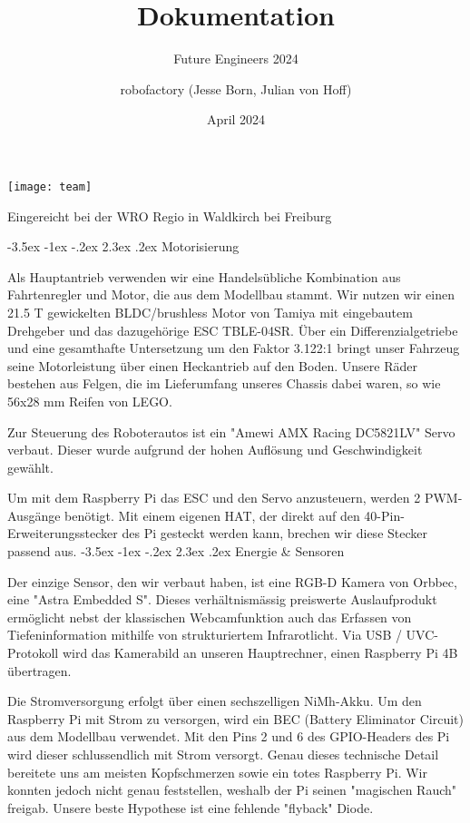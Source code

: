 \documentclass[a4paper]{scrarticle}
\makeatletter
\renewcommand\section{\@startsection {section}{1}{\z@}%
                                   {-3.5ex \@plus -1ex \@minus -.2ex}%
                                   {2.3ex \@plus.2ex}%
                                   {\Huge\AKAfont}}
\renewcommand{\maketitle}{%
																		 \begin{titlepage}
																			 \null\vfill %
																			 \begin{center}
																				{\huge\@title\par}%
																				\vspace{0.5cm} %
																				{\large\@subtitle\par} %
																				\vspace{1.5cm} %
																				{\Large\@author\par}
																				\vspace{2.5cm} %
																				\begin{center}
																					\texttt{[image: team]}
																				\end{center}
																				\vfill
																				\vspace{0.5cm} %
																				{\large\@date\par} %
																				Eingereicht bei der WRO Regio in Waldkirch bei Freiburg
																			 \end{center}
																			 \@thanks %
																		 \end{titlepage}%
																	 }
\makeatother
\begin{document}
\title{\AKAfont\Huge\textcolor{AKSAcolor}{Dokumentation}}
\subtitle{Future Engineers 2024}
\author{robofactory (Jesse Born, Julian von Hoff)}
\date{April 2024}


\maketitle
\clearpage
\newpage



\section{Motorisierung}

Als Hauptantrieb verwenden wir eine Handelsübliche Kombination aus Fahrtenregler und Motor, die aus dem Modellbau stammt.
Wir nutzen wir einen 21.5 T gewickelten BLDC/brushless Motor von Tamiya mit eingebautem Drehgeber und das dazugehörige ESC TBLE-04SR. 
Über ein Differenzialgetriebe und eine gesamthafte Untersetzung um den Faktor 3.122:1 bringt unser Fahrzeug seine Motorleistung über einen Heckantrieb auf den Boden.
Unsere Räder bestehen aus Felgen, die im Lieferumfang unseres Chassis dabei waren, so wie 56x28 mm Reifen von LEGO.

Zur Steuerung des Roboterautos ist ein "Amewi AMX Racing DC5821LV" Servo verbaut. Dieser wurde aufgrund der hohen Auflösung und Geschwindigkeit gewählt.

Um mit dem Raspberry Pi das ESC und den Servo anzusteuern, werden 2 PWM-Ausgänge benötigt. Mit einem eigenen HAT, der direkt auf den 40-Pin-Erweiterungsstecker des Pi gesteckt werden kann, brechen wir diese Stecker passend aus.
\section{Energie \& Sensoren}

Der einzige Sensor, den wir verbaut haben, ist eine RGB-D Kamera von Orbbec, eine "Astra Embedded S".
Dieses verhältnismässig preiswerte Auslaufprodukt ermöglicht nebst der klassischen Webcamfunktion auch das Erfassen von Tiefeninformation mithilfe von strukturiertem Infrarotlicht.
Via USB / UVC-Protokoll wird das Kamerabild an unseren Hauptrechner, einen Raspberry Pi 4B übertragen.


Die Stromversorgung erfolgt über einen sechszelligen NiMh-Akku. Um den Raspberry Pi mit Strom zu versorgen, wird ein BEC (Battery Eliminator Circuit) aus dem Modellbau verwendet. 
Mit den Pins 2 und 6 des GPIO-Headers des Pi wird dieser schlussendlich mit Strom versorgt.
Genau dieses technische Detail bereitete uns am meisten Kopfschmerzen sowie ein totes Raspberry Pi. Wir konnten jedoch nicht genau feststellen, weshalb der Pi seinen "magischen Rauch" freigab. Unsere beste Hypothese ist eine fehlende "flyback" Diode.
\end{document}
